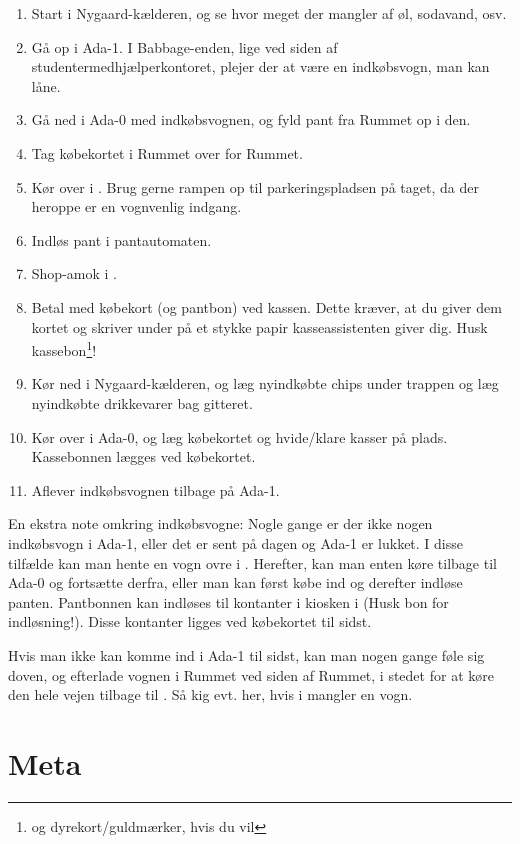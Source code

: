 \begin{enumerate}
\item Start i Nygaard-kælderen, og se hvor meget der mangler af øl,
  sodavand, osv.
\item Gå op i Ada-1. I Babbage-enden, lige ved siden af
  studentermedhjælperkontoret, plejer der
  at være en indkøbsvogn, man kan låne.
\item Gå ned i Ada-0 med indkøbsvognen, og fyld pant fra Rummet op i
  den.
\item Tag købekortet i Rummet over for Rummet.
\item Kør over i \fotex. Brug gerne rampen op til parkeringspladsen på
  taget, da der heroppe er en vognvenlig indgang.
\item Indløs pant i pantautomaten.
\item Shop-amok i \fotex.
\item Betal med købekort (og pantbon) ved kassen. Dette kræver, at du
  giver dem kortet og skriver under på et stykke papir
  kasseassistenten giver dig. Husk kassebon\footnote{og
    dyrekort/guldmærker, hvis du vil}!
\item Kør ned i Nygaard-kælderen, og læg nyindkøbte chips under
  trappen og læg nyindkøbte drikkevarer bag gitteret.
\item Kør over i Ada-0, og læg købekortet og hvide/klare kasser på
  plads. Kassebonnen lægges ved købekortet.
\item Aflever indkøbsvognen tilbage på Ada-1.
\end{enumerate}

En ekstra note omkring indkøbsvogne: Nogle gange er der ikke nogen
indkøbsvogn i Ada-1, eller det er sent på dagen og Ada-1 er lukket. I
disse tilfælde kan man hente en vogn ovre i \fotex. Herefter, kan man
enten køre tilbage til Ada-0 og fortsætte derfra, eller man kan først
købe ind og derefter indløse panten. Pantbonnen kan indløses til
kontanter i kiosken i \fotex (Husk bon for indløsning!). Disse
kontanter ligges ved købekortet til sidst.

Hvis man ikke kan komme ind i Ada-1 til sidst, kan man nogen gange
føle sig doven, og efterlade vognen i Rummet ved siden af Rummet, i
stedet for at køre den hele vejen tilbage til \fotex. Så kig evt. her,
hvis i mangler en vogn.

\section{Meta}
\label{sec:meta}

